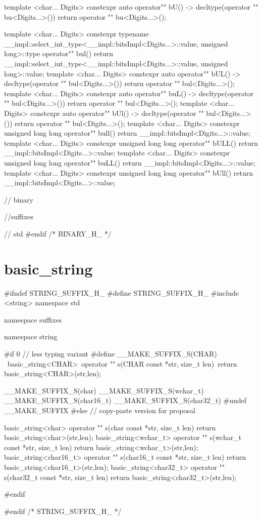 \documentclass[ebook,11pt,article]{memoir}
\begin{document}
\begin{codeblock}
{{{template <char... Digits>
constexpr auto
operator"" bU() -> decltype(operator "" bu<Digits...>()){
    return     operator "" bu<Digits...>();
}

template <char... Digits>
constexpr typename
__impl::select_int_type<__impl::bitsImpl<Digits...>::value,
       unsigned long>::type
operator"" bul(){
    return     __impl::select_int_type<__impl::bitsImpl<Digits...>::value,
                  unsigned long>::value;
}
template <char... Digits>
constexpr auto
operator"" bUL() -> decltype(operator "" bul<Digits...>()){
    return     operator "" bul<Digits...>();
}
template <char... Digits>
constexpr auto
operator"" buL() -> decltype(operator "" bul<Digits...>()){
    return     operator "" bul<Digits...>();
}
template <char... Digits>
constexpr auto
operator"" bUl() -> decltype(operator "" bul<Digits...>()){
    return     operator "" bul<Digits...>();
}
template <char... Digits>
constexpr unsigned long long
operator"" bull(){
    return __impl::bitsImpl<Digits...>::value;
}
template <char... Digits>
constexpr unsigned long long
operator"" bULL(){
    return __impl::bitsImpl<Digits...>::value;
}
template <char... Digits>
constexpr unsigned long long
operator"" buLL(){
    return __impl::bitsImpl<Digits...>::value;
}
template <char... Digits>
constexpr unsigned long long
operator"" bUll(){
    return __impl::bitsImpl<Digits...>::value;
}


} // binary
} //suffixes
} // std
#endif /* BINARY_H_ */
\end{codeblock}


\section{basic_string}
\begin{codeblock}
#ifndef STRING_SUFFIX_H_
#define STRING_SUFFIX_H_
#include <string>
namespace std{
namespace suffixes{
namespace string{
#if 0 // less typing variant
#define __MAKE_SUFFIX_S(CHAR) \
    basic_string<CHAR>\
operator "" s(CHAR const *str, size_t len){\
    return basic_string<CHAR>(str,len);\
}

__MAKE_SUFFIX_S(char)
__MAKE_SUFFIX_S(wchar_t)
__MAKE_SUFFIX_S(char16_t)
__MAKE_SUFFIX_S(char32_t)
#undef __MAKE_SUFFIX
#else // copy-paste version for proposal

basic_string<char>
operator "" s(char const *str, size_t len){
    return basic_string<char>(str,len);
}
basic_string<wchar_t>
operator "" s(wchar_t const *str, size_t len){
    return basic_string<wchar_t>(str,len);
}
basic_string<char16_t>
operator "" s(char16_t const *str, size_t len){
    return basic_string<char16_t>(str,len);
}
basic_string<char32_t>
operator "" s(char32_t const *str, size_t len){
    return basic_string<char32_t>(str,len);
}

#endif
}
}
}
#endif /* STRING_SUFFIX_H_ */
\end{codeblock}
\end{document}

